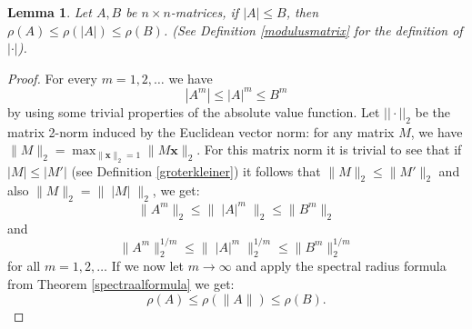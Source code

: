 \documentclass[a4paper,11pt]{report}
\newtheorem{lemma}[theorem]{Lemma}
\begin{document}
\begin{lemma}\label{voriglemmaspeer}
  Let $A, B$ be $n \times n$-matrices, if $|A| \leq B$, then $\rho(A) \leq \rho(|A|) \leq
  \rho(B)$. (See Definition \ref{modulusmatrix} for the definition of $|\cdot|$).
\end{lemma}
\begin{proof}
  For every $m=1,2,\ldots$ we have
  $$|A^m| \leq |A|^m \leq B^m$$
  by using some trivial properties of the absolute value function. Let $||\cdot||_2$ be the matrix 
  2-norm induced by the Euclidean vector norm: for any matrix $M$, we have $\|M\|_2 =
  \max_{\|\mathbf{x}\|_2 = 1}\|M\mathbf{x}\|_2$. For this matrix norm it is 
  trivial to see that if $|M| \leq |M'|$ (see Definition \ref{groterkleiner}) it follows that $\|M\|_2 \leq \|M'\|_2$ and also $\|M\|_2 = \|\;|M|\;\|_2$, we get:
  $$\|A^m\|_2 \leq \|\;|A|^m\;\|_2 \leq \|B^m\|_2$$
  and 
  $$\|A^m\|^{1/m}_2 \leq \|\;|A|^m\;\|^{1/m}_2 \leq \|B^m\|^{1/m}_2$$
  for all $m = 1, 2, \ldots$ If we now let $m \to \infty$ and apply the spectral 
  radius formula from Theorem \ref{spectraalformula} we get:
  $$\rho(A) \leq \rho(\|A\|) \leq \rho(B).$$
\end{proof}
\end{document}
